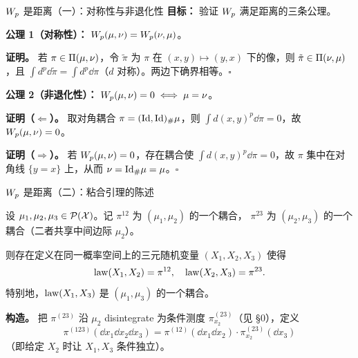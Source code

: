 \begin{frame}{$W_{p}$ 是距离（一）：对称性与非退化性}
  \textbf{目标：} 验证 $W_{p}$ 满足距离的三条公理。

  \textbf{公理 1（对称性）：} $W_{p}(\mu,\nu)=W_{p}(\nu,\mu)$。

  \textbf{证明。} 若 $\pi\in\Pi(\mu,\nu)$，令 $\tilde{\pi}$ 为 $\pi$ 在 $(x,y)\mapsto(y,x)$ 下的像，则 $\tilde{\pi}\in\Pi(\nu,\mu)$，且 $\int d^{p}\dd\tilde{\pi}=\int d^{p}\dd\pi$（$d$ 对称）。两边下确界相等。$\square$

  \textbf{公理 2（非退化性）：} $W_{p}(\mu,\nu)=0 \iff \mu=\nu$。

  \textbf{证明（$\Leftarrow$）。} 取对角耦合 $\pi=(\mathrm{Id},\mathrm{Id})_{\#}\mu$，则 $\int d(x,y)^{p}\dd\pi=0$，故 $W_{p}(\mu,\nu)=0$。

  \textbf{证明（$\Rightarrow$）。} 若 $W_{p}(\mu,\nu)=0$，存在耦合使 $\int d(x,y)^{p}\dd\pi=0$，故 $\pi$ 集中在对角线 $\{y=x\}$ 上，从而 $\nu={\mathrm{Id}}_{\#}\mu=\mu$。$\square$

\end{frame}

\begin{frame}{$W_{p}$ 是距离（二）：粘合引理的陈述}

  设 $\mu_{1},\mu_{2},\mu_{3}\in\mathcal{P}(\mathcal{X})$。记 $\pi^{12}$ 为 $(\mu_{1},\mu_{2})$ 的一个耦合，
  $\pi^{23}$ 为 $(\mu_{2},\mu_{3})$ 的一个耦合（二者共享中间边际 $\mu_{2}$）。

  则存在定义在同一概率空间上的三元随机变量 $(X_{1},X_{2},X_{3})$ 使得
  \[
    \operatorname{law}(X_{1},X_{2}) = \pi^{12}, \quad
    \operatorname{law}(X_{2},X_{3}) = \pi^{23}.
  \]
  特别地，$\operatorname{law}(X_{1},X_{3})$ 是 $(\mu_{1},\mu_{3})$ 的一个耦合。

  \textbf{构造。} 把 $\pi^{(23)}$ 沿 $\mu_2$ disintegrate 为条件测度 $\pi^{(23)}_{x_2}$（见 §0），定义
  \[
    \pi^{(123)}(\dd x_{1}\dd x_{2}\dd x_{3})
    = \pi^{(12)}(\dd x_{1}\dd x_{2})\cdot\pi^{(23)}_{x_{2}}(\dd x_{3})
  \]
  （即给定 $X_2$ 时让 $X_1,X_3$ 条件独立）。

\end{frame}

